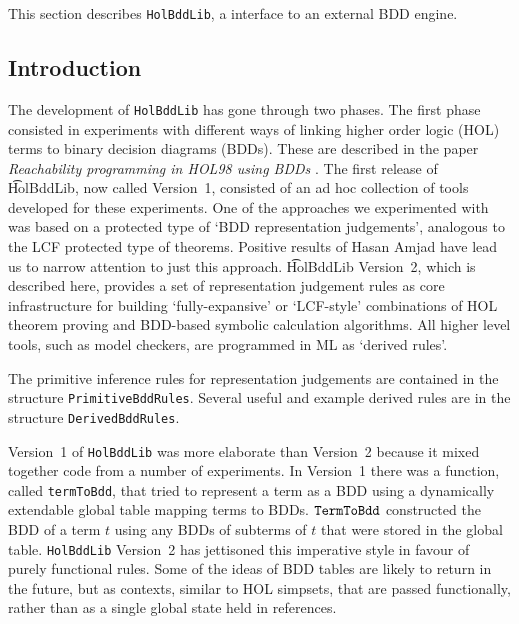 %

This section describes {\tt HolBddLib}, a \HOL{} interface to an external BDD engine.

\subsection{Introduction}

The development of {\tt HolBddLib} has gone through two phases.  The
first phase consisted in experiments with different ways of linking
higher order logic (HOL) terms to binary decision diagrams (BDDs).
These are described in the paper {\it Reachability programming in
HOL98 using BDDs\/} \cite{tphols2000-Gordon}. The first release of
\t{HolBddLib}, now called Version~1, consisted of an ad hoc collection
of tools developed for these experiments.  One of the approaches we
experimented with was based on a protected type of `BDD representation
judgements', analogous to the LCF protected type of theorems.
Positive results of Hasan Amjad \cite{Amjad:TPHOLs2001} have lead us
to narrow attention to just this approach. \t{HolBddLib} Version~2,
which is described here, provides a set of representation judgement
rules as core infrastructure for building `fully-expansive' or
`LCF-style' combinations of HOL theorem proving and BDD-based symbolic
calculation algorithms. All higher level tools, such as model
checkers, are programmed in ML as `derived rules'.

The primitive inference rules for representation judgements are contained in the structure
{\tt{PrimitiveBddRules}}. Several useful and example  derived rules are in the
structure {\tt{DerivedBddRules}}. 

Version~1 of {\tt{HolBddLib}} was more elaborate than Version~2
because it mixed together code from a number of experiments.
In Version~1 there was a function, called
{\texttt{termToBdd}}, that tried to represent a \HOL{} term as a BDD
using a dynamically extendable global table mapping \HOL{} terms to
BDDs.  $\mbox{\tt TermToBdd}$ constructed the BDD of a term $t$ using any
BDDs of subterms of $t$ that were stored in the global table.
{\tt{HolBddLib}} Version~2 has jettisoned this imperative style
in favour of purely functional rules. Some of
the ideas of BDD tables are likely to return in the future, but as
contexts, similar to HOL simpsets, that are passed functionally,
rather than as a single global state held in references.

